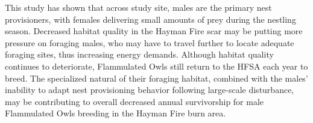 \documentclass[]{article}
\begin{document}
This study has shown that across study site, males are the primary nest
provisioners, with females delivering small amounts of prey during the
nestling season. Decreased habitat quality in the Hayman Fire scar may
be putting more pressure on foraging males, who may have to travel
further to locate adequate foraging sites, thus increasing energy
demands. Although habitat quality continues to deteriorate, Flammulated
Owls still return to the HFSA each year to breed. The specialized
natural of their foraging habitat, combined with the males' inability to
adapt nest provisioning behavior following large-scale disturbance, may
be contributing to overall decreased annual survivorship for male
Flammulated Owls breeding in the Hayman Fire burn area.

\renewcommand\refname{References}

\end{document}
